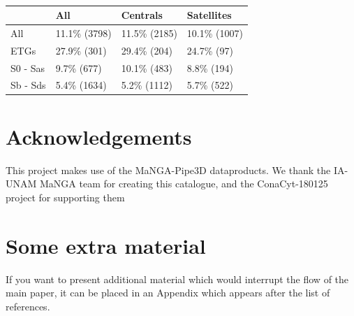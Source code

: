 \documentclass[fleqn,usenatbib]{mnras}
\begin{document}
\begin{table}
\begin{tabular}{llll}
\hline
          &           All &      Centrals &    Satellites \\
\hline
      All &  11.1\% (3798) &  11.5\% (2185) &  10.1\% (1007) \\
     ETGs &   27.9\% (301) &   29.4\% (204) &    24.7\% (97) \\
 S0 - Sas &    9.7\% (677) &   10.1\% (483) &    8.8\% (194) \\
 Sb - Sds &   5.4\% (1634) &   5.2\% (1112) &    5.7\% (522) \\
\end{tabular}
\caption{}
\label{tab:mega_table}
\end{table}





\section*{Acknowledgements}
This project makes use of the MaNGA-Pipe3D dataproducts. We thank the IA-UNAM MaNGA team for creating this catalogue, and the ConaCyt-180125 project for supporting them

\appendix

\section{Some extra material}

If you want to present additional material which would interrupt the flow of the main paper,
it can be placed in an Appendix which appears after the list of references.



\bsp	%
\label{lastpage}
\end{document}
